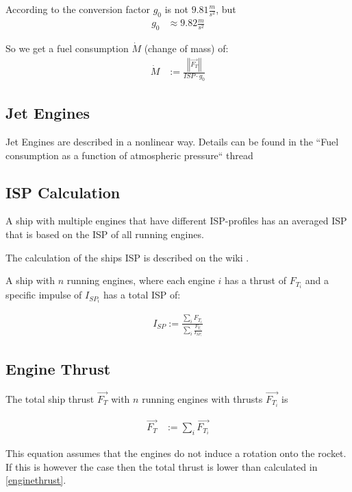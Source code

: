 \documentclass[11pt]{report}
\newcommand{\oa}[1]{\overrightarrow{#1}}
\newcommand{\F}[1]{\oa{F_{#1}}}
\newcommand{\absvec}[1]{\left|\left|{#1}\right|\right|}
\begin{document}
According to \cite{ECF} the conversion factor $g_0$ is not
$9.81\frac{m}{s^2}$, but
\begin{align}
  g_0 &\approx 9.82\frac{m}{s^2}
\end{align}

So we get a fuel consumption $\dot{M}$ (change of mass) \cite{SPI} of:
\begin{align}
\dot{M} & := \frac{\absvec{\oa{F_T}}}{ISP \cdot g_0}
\end{align}

\subsection{Jet Engines}

Jet Engines are described in a nonlinear way. Details can be found in
the ``Fuel consumption as a function of atmospheric pressure`` thread
\cite{JetEngines}

\subsection{ISP Calculation}

A ship with multiple engines that have different ISP-profiles has an
averaged ISP that is based on the ISP of all running engines.

The calculation of the ships ISP is described on the wiki
\cite{MulEng}.

A ship with $n$ running engines, where each engine $i$ has a thrust of
$F_{T_i}$ and a specific impulse of $I_{SP_i}$ has a total ISP of:

\begin{align}
  I_{SP} := \frac{\sum_i{F_{T_i}}}{\sum_i{\frac{F_{T_i}}{I_{SP_i}}}}
\end{align}

\subsection{Engine Thrust}

The total  ship thrust $\F{T}$ with $n$ running engines
with thrusts $\F{T_i}$ is

\begin{align}
  \F{T} & := \sum_{i}\F{T_i}\label{enginethrust}
\end{align}

This equation assumes that the engines do not induce a rotation onto
the rocket. If this is however the case then the total thrust is lower
than calculated in \eqref{enginethrust}.
\end{document}
